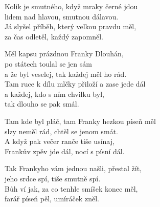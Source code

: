 
\ve{}
Kolik je smutného, když mraky černé jdou\\
lidem nad hlavou, smutnou dálavou.\\
Já slyšel příběh, který velkou pravdu měl,\\
za čas odletěl, každý zapomněl.

\cho{}
Měl kapsu prázdnou Franky Dlouhán,\\
po státech toulal se jen sám\\
a že byl veselej, tak každej měl ho rád.\\
Tam ruce k dílu mlčky přiloží a zase jede dál\\
a každej, kdo s ním chvilku byl,\\
tak dlouho se pak smál.

\ve{}
Tam kde byl pláč, tam Franky hezkou píseň měl\\
slzy neměl rád, chtěl se jenom smát.\\
A když pak večer ranče tiše usínaj,\\
Frankův zpěv jde dál, nocí s písní dál.

\cho{}

\ve{}
Tak Frankyho vám jednou našli, přestal žít,\\
jeho srdce spí, tiše smutně spí.\\
Bůh ví jak, za co tenhle smíšek konec měl,\\
farář píseň pěl, umíráček zněl.

\cho{}

\esong